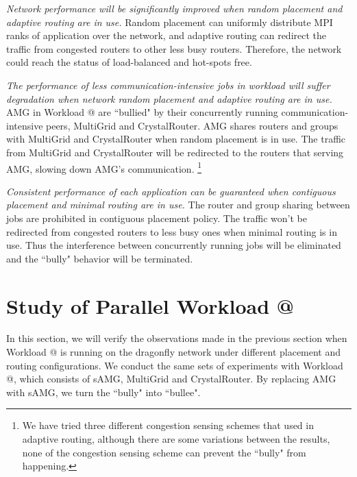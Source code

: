 \documentclass[conference,compsoc]{IEEEtran}
\makeatletter
\newcommand{\Rmnum}[1]{\expandafter\@slowromancap\romannumeral #1@}
\makeatother
\begin{document}
\emph{Network performance will be significantly improved when random placement and adaptive routing are in use.} Random placement can uniformly distribute MPI ranks of application over the network, and adaptive routing can redirect the traffic from congested routers to other less busy routers. Therefore, the network could reach the status of load-balanced and hot-spots free. 

\emph{The performance of less communication-intensive jobs in workload will suffer degradation when network random placement and adaptive routing are in use.} AMG in Workload \Rmnum{1} are ``bullied" by their concurrently running communication-intensive peers, MultiGrid and CrystalRouter. AMG shares routers and groups with MultiGrid and CrystalRouter when random placement is in use. The traffic from MultiGrid and CrystalRouter will be redirected to the routers that serving AMG, slowing down AMG's communication. \footnote{We have tried three different congestion sensing schemes that used in adaptive routing\cite{won-prog-adaptive}, although there are some variations between the results, none of the congestion sensing scheme can prevent the ``bully" from happening.}

\emph{Consistent performance of each application can be guaranteed when contiguous placement and minimal routing are in use.} The router and group sharing between jobs are prohibited in contiguous placement policy. The traffic won't be redirected from congested routers to less busy ones when minimal routing is in use. Thus the interference between concurrently running jobs will be eliminated and the ``bully" behavior will be terminated. 


\section{Study of Parallel Workload \Rmnum{2 }}
\label{sec:workload-2}

In this section, we will verify the observations made in the previous section when Workload \Rmnum{1} is running on the dragonfly network under different placement and routing configurations. We conduct the same sets of experiments with Workload \Rmnum{2}, which consists of sAMG, MultiGrid and CrystalRouter. By replacing AMG with sAMG, we turn the ``bully" into ``bullee".
\end{document}
